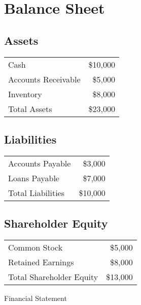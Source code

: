 \begin{figure}[h]
  \centering
  \caption{Financial Statement}
  \label{fig:financial_statement}
  
  \section*{Balance Sheet}
  
  \subsection*{Assets}
  \begin{tabular}{lr}
    Cash & \$10,000 \\
    Accounts Receivable & \$5,000 \\
    Inventory & \$8,000 \\
    \midrule
    Total Assets & \$23,000 \\
  \end{tabular}
  
  \subsection*{Liabilities}
  \begin{tabular}{lr}
    Accounts Payable & \$3,000 \\
    Loans Payable & \$7,000 \\
    \midrule
    Total Liabilities & \$10,000 \\
  \end{tabular}
  
  \subsection*{Shareholder Equity}
  \begin{tabular}{lr}
    Common Stock & \$5,000 \\
    Retained Earnings & \$8,000 \\
    \midrule
    Total Shareholder Equity & \$13,000 \\
  \end{tabular}
  
\end{figure}
